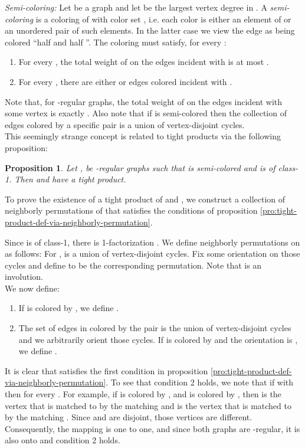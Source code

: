 \documentclass[12pt]{article}
\newtheorem{proposition}[theorem]{Proposition}
\newtheorem{open question}[theorem]{Open question}
\newcommand{\proof}{{\par\noindent {\bf Proof}\space\space}}
\newcommand{\proofbox}{\begin{flushright}\end{flushright}}
\begin{document}
{\em Semi-coloring:} Let  be a graph and let  be the largest vertex degree in . A {\em semi-coloring} is a coloring of  with color set , i.e. each color is either an element of  or an
unordered pair of such elements. In the latter case we view the edge as being colored ``half  and half ''. The coloring must satisfy, for every :
\begin{enumerate}
\item For every , the total weight of  on the edges incident with  is at most .
\item For every , there are either  or  edges colored  incident with .
\end{enumerate}
Note that, for -regular graphs, the total weight of  on the edges incident with some vertex  is exactly . Also note that if  is semi-colored then the collection of edges colored by a specific pair is a union of vertex-disjoint cycles.\\
This seemingly strange concept is related to tight products via the following proposition:
\begin{proposition}\label{pro:semi-coloring}
Let , be -regular graphs such that  is semi-colored and  is of class-1. Then  and  have a tight product.
\end{proposition}
\proof
To prove the existence of a tight product of  and , we construct a collection  of neighborly permutations of  that satisfies the conditions of proposition \ref{pro:tight-product-def-via-neighborly-permutation}.

Since  is of class-1, there is 1-factorization . We define neighborly permutations on  as follows: For ,  is a union of vertex-disjoint cycles. Fix some orientation on those cycles and define  to be the corresponding permutation. Note that  is an involution.\\
We now define:
\begin{enumerate}
\item If  is colored by , we define .
\item The set of edges in  colored by the pair  is the union of vertex-disjoint cycles and we arbitrarily orient those cycles. If  is colored by  and the orientation is , we define .
\end{enumerate}
It is clear that  satisfies the first condition in proposition \ref{pro:tight-product-def-via-neighborly-permutation}.
To see that condition 2 holds, we note that if  with  then 
 for every . 
For example, if  is colored by , and  is colored by , then 
 is the vertex that is matched to  by the matching  and 
 is the vertex that is matched to 
 by the matching . Since  and  are disjoint, those vertices are different. 
Consequently, the mapping  is one to one, 
and since both graphs are -regular, it is also onto and condition 2 holds.  
\proofbox
\end{document}
